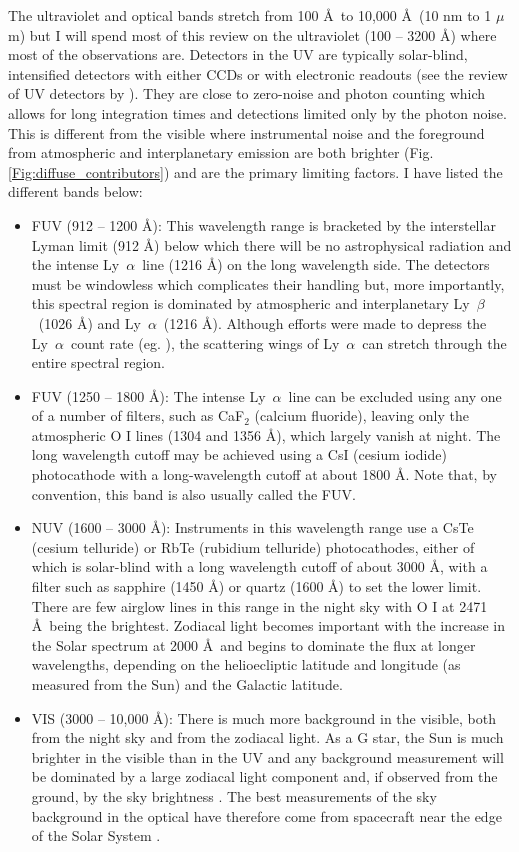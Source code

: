 \documentclass{iau}
\newcommand\micron{\mbox{$\mu$m}}%
\newcommand{\lya}{Ly~$\alpha$}
\newcommand{\lyb}{Ly~$\beta$}
\begin{document}
The ultraviolet and optical bands stretch from 100 \AA\ to 10,000 \AA\ (10 nm to 1 \micron) but I will spend most of this review on the ultraviolet (100 -- 3200 \AA) where most of the observations are. Detectors in the UV are typically solar-blind, intensified detectors with either CCDs or with electronic readouts (see the review of UV detectors by \cite{Joseph1995}). They are close to zero-noise and photon counting which allows for long integration times and detections limited only by the photon noise. This is different from the visible where instrumental noise and the foreground from atmospheric and interplanetary emission are both brighter (Fig. \ref{Fig:diffuse_contributors}) and are the primary limiting factors. I have listed the different bands below:
\begin{itemize}
    \item FUV (912 -- 1200 \AA): This wavelength range is bracketed by the interstellar Lyman limit (912 \AA) below which there will be no astrophysical radiation and the intense \lya\ line (1216 \AA) on the long wavelength side.  The detectors must be windowless which complicates their handling but, more importantly, this spectral region is dominated by atmospheric and interplanetary \lyb\ (1026 \AA) and \lya\ (1216 \AA). Although efforts were made to depress the \lya\ count rate (eg. \citet{Stern_NH_2008}), the scattering wings of \lya\ can stretch through the entire spectral region.
    \item FUV (1250 -- 1800 \AA): The intense \lya\ line can be excluded using any one of a number of filters, such as CaF$_{2}$ (calcium fluoride), leaving only the atmospheric O I lines (1304 and 1356 \AA), which largely vanish at night. The long wavelength cutoff may be achieved using a CsI (cesium iodide) photocathode with a long-wavelength cutoff at about 1800 \AA. Note that, by convention, this band is also usually called the FUV.
    \item NUV (1600 -- 3000 \AA): Instruments in this wavelength range use a CsTe (cesium telluride) or RbTe (rubidium telluride) photocathodes, either of which is solar-blind with a long wavelength cutoff of about 3000 \AA, with a filter such as sapphire (1450 \AA) or quartz (1600 \AA) to set the lower limit. There are few airglow lines in this range in the night sky with O I at 2471 \AA\ being the brightest. Zodiacal light becomes important with the increase in the Solar spectrum at 2000 \AA\ and begins to dominate the flux at longer wavelengths, depending on the helioecliptic latitude and longitude (as measured from the Sun) and the Galactic latitude.
    \item VIS (3000 -- 10,000 \AA): There is much more background in the visible, both from the night sky and from the zodiacal light. As a G star, the Sun is much brighter in the visible than in the UV and any background measurement will be dominated by a large zodiacal light component \citep{Leinert1998} and, if observed from the ground, by the sky brightness \citep{Mattila2017}. The best measurements of the sky background in the optical have therefore come from spacecraft near the edge of the Solar System \citep{Toller_EBL}.
\end{itemize}
\end{document}
